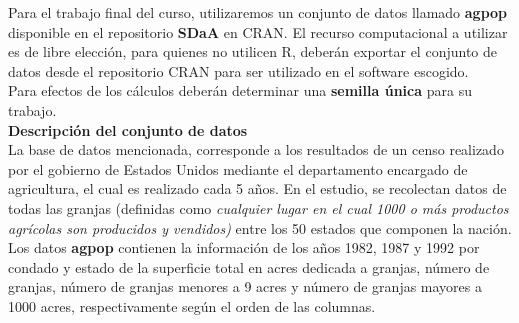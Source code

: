 


\addpoints

Para el trabajo final del curso, utilizaremos un conjunto de datos llamado \textbf{agpop} disponible en el repositorio \textbf{SDaA} en CRAN. El recurso computacional a utilizar es de libre elección, para quienes no utilicen R, deberán exportar el conjunto de datos desde el repositorio CRAN para ser utilizado en el software escogido.\\

Para efectos de los cálculos deberán determinar una \textbf{semilla única} para su trabajo.\\

\textbf{Descripción del conjunto de datos}
\\
La base de datos mencionada, corresponde a los resultados de un censo realizado por el gobierno de Estados Unidos mediante el departamento encargado de agricultura, el cual es realizado cada 5 años. En el estudio, se recolectan datos de todas las granjas (definidas como \textit{cualquier lugar en el cual 1000 o más productos agrícolas son producidos y vendidos)} entre los 50 estados que componen la nación.\\

Los datos \textbf{agpop} contienen la información de los años 1982, 1987 y 1992 por condado y estado de la superficie total en acres dedicada a granjas, número de granjas, número de granjas menores a 9 acres y número de granjas mayores a 1000 acres, respectivamente según el orden de las columnas.\\

